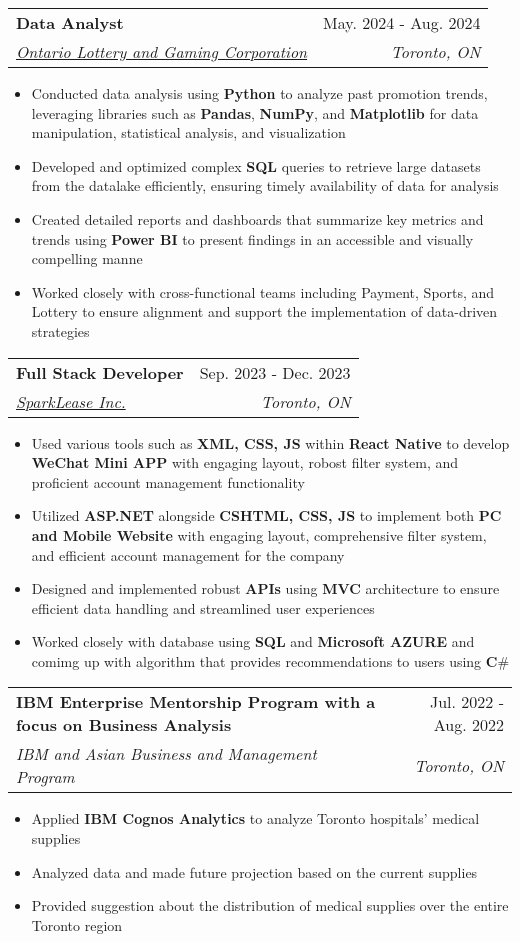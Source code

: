 \documentclass[letterpaper,11pt]{article}
\makeatletter
\newcommand{\resumeItem}[1]{
  \item\small{
    {#1 \vspace{-2pt}}
  }
}
\newcommand{\resumeSubheading}[4]{
  \vspace{-2pt}\item
    \begin{tabular*}{0.97\textwidth}[t]{l@{\extracolsep{\fill}}r}
      \textbf{#1} & #2 \\
      \textit{\small#3} & \textit{\small #4} \\
    \end{tabular*}\vspace{-7pt}
}
\newcommand{\resumeItemListStart}{\begin{itemize}}
\newcommand{\resumeItemListEnd}{\end{itemize}\vspace{-5pt}}
\makeatother
\begin{document}
    \resumeSubheading
      {Data Analyst}{May. 2024 - Aug. 2024}
      {\href{https://www.olg.ca/en/home.html}{Ontario Lottery and Gaming Corporation}}{Toronto, ON}
      \resumeItemListStart
        \resumeItem{Conducted data analysis using \textbf{Python} to analyze past promotion trends, leveraging libraries such as \textbf{Pandas}, \textbf{NumPy}, and \textbf{Matplotlib} for data manipulation, statistical analysis, and visualization}
        \resumeItem{Developed and optimized complex \textbf{SQL} queries to retrieve large datasets from the datalake efficiently, ensuring timely availability of data for analysis}
        \resumeItem{Created detailed reports and dashboards that summarize key metrics and trends using \textbf{Power BI} to present findings in an accessible and visually compelling manne}
        \resumeItem{Worked closely with cross-functional teams including Payment, Sports, and Lottery to ensure alignment and support the implementation of data-driven strategies}
      \resumeItemListEnd

    \resumeSubheading
      {Full Stack Developer}{Sep. 2023 - Dec. 2023}
      {\href{https://www.sparklease.com/en/Home/Index}{SparkLease Inc.}}{Toronto, ON}
      \resumeItemListStart
        \resumeItem{Used various tools such as \textbf{XML, CSS, JS} within \textbf{React Native} to develop \textbf{WeChat Mini APP} with engaging layout, robost filter system, and proficient account management functionality}
        \resumeItem{Utilized \textbf{ASP.NET} alongside \textbf{CSHTML, CSS, JS} to implement both \textbf{PC and Mobile Website} with engaging layout, comprehensive filter system, and efficient account management for the company}
        \resumeItem{Designed and implemented robust \textbf{APIs} using \textbf{MVC} architecture to ensure efficient data handling and streamlined user experiences}
        \resumeItem{Worked closely with database using \textbf{SQL} and \textbf{Microsoft AZURE} and comimg up with algorithm that provides recommendations to users using \textbf{C$\#$}}
      \resumeItemListEnd

    \resumeSubheading
      {IBM Enterprise Mentorship Program with a focus on Business Analysis}{Jul. 2022 - Aug. 2022}
      {IBM and Asian Business and Management Program}{Toronto, ON}
      \resumeItemListStart
        \resumeItem{Applied \textbf{IBM Cognos Analytics} to analyze Toronto hospitals' medical supplies}
        \resumeItem{Analyzed data and made future projection based on the current supplies}
        \resumeItem{Provided suggestion about the distribution of medical supplies over the entire Toronto region}
    \resumeItemListEnd
\end{document}
